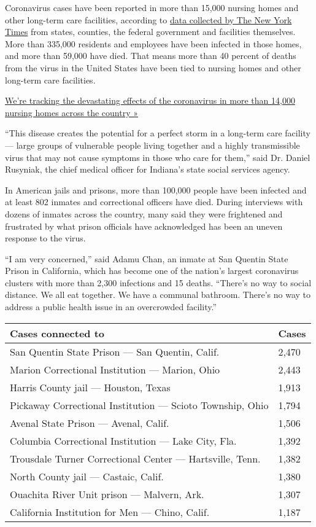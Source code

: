 Coronavirus cases have been reported in more than 15,000 nursing homes
and other long-term care facilities, according to
\href{https://www.nytimes.com/interactive/2020/us/coronavirus-nursing-homes.html}{data
collected by The New York Times} from states, counties, the federal
government and facilities themselves. More than 335,000 residents and
employees have been infected in those homes, and more than 59,000 have
died. That means more than 40 percent of deaths from the virus in the
United States have been tied to nursing homes and other long-term care
facilities.

\href{https://www.nytimes.com/interactive/2020/us/coronavirus-nursing-homes.html}{We're
tracking the devastating effects of the coronavirus in more than 14,000
nursing homes across the country »}

``This disease creates the potential for a perfect storm in a long-term
care facility --- large groups of vulnerable people living together and
a highly transmissible virus that may not cause symptoms in those who
care for them,'' said Dr. Daniel Rusyniak, the chief medical officer for
Indiana's state social services agency.

In American jails and prisons, more than 100,000 people have been
infected and at least 802 inmates and correctional officers have died.
During interviews with dozens of inmates across the country, many said
they were frightened and frustrated by what prison officials have
acknowledged has been an uneven response to the virus.

``I am very concerned,'' said Adamu Chan, an inmate at San Quentin State
Prison in California, which has become one of the nation's largest
coronavirus clusters with more than 2,300 infections and 15 deaths.
``There's no way to social distance. We all eat together. We have a
communal bathroom. There's no way to address a public health issue in an
overcrowded facility.''

\begin{longtable}[]{@{}ll@{}}
\toprule
Cases connected to & Cases\tabularnewline
\midrule
\endhead
San Quentin State Prison --- San Quentin, Calif. & 2,470 \tabularnewline
Marion Correctional Institution --- Marion, Ohio & 2,443 \tabularnewline
Harris County jail --- Houston, Texas & 1,913 \tabularnewline
Pickaway Correctional Institution --- Scioto Township, Ohio & 1,794
\tabularnewline
Avenal State Prison --- Avenal, Calif. & 1,506 \tabularnewline
Columbia Correctional Institution --- Lake City, Fla. & 1,392
\tabularnewline
Trousdale Turner Correctional Center --- Hartsville, Tenn. & 1,382
\tabularnewline
North County jail --- Castaic, Calif. & 1,380 \tabularnewline
Ouachita River Unit prison --- Malvern, Ark. & 1,307 \tabularnewline
California Institution for Men --- Chino, Calif. & 1,187 \tabularnewline
\bottomrule
\end{longtable}

